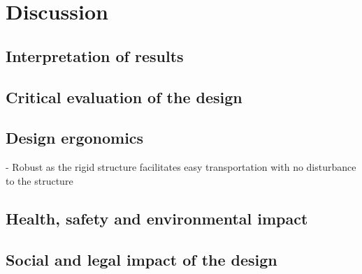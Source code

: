 
\section{Discussion}

\subsection{Interpretation of results}

\subsection{Critical evaluation of the design}



\subsection{Design ergonomics}

- Robust as the rigid structure facilitates easy transportation with no disturbance to the structure

\subsection{Health, safety and environmental impact}

\subsection{Social and legal impact of the design}


\newpage



